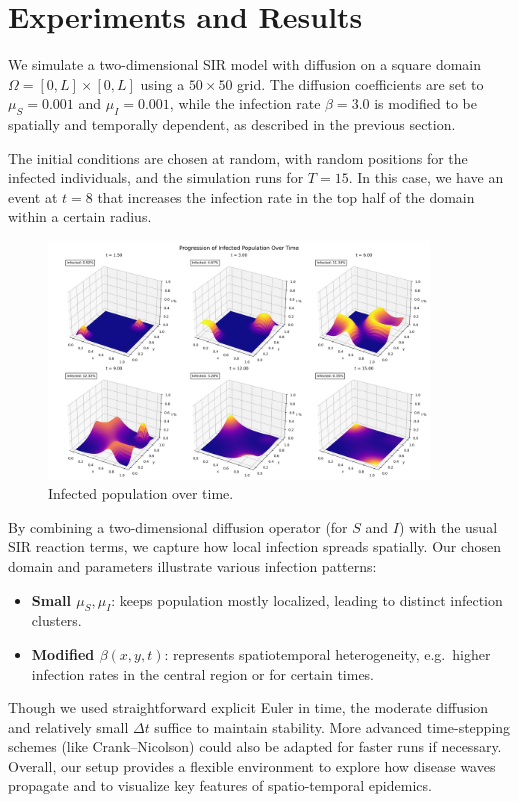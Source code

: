 \section{Experiments and Results}

We simulate a two-dimensional SIR model with diffusion on a square domain \(\Omega = [0,L]\times [0,L]\) using a \(50\times 50\) grid.
The diffusion coefficients are set to \(\mu_S = 0.001\) and \(\mu_I = 0.001\), while the infection rate \(\beta=3.0\) is modified to be spatially and temporally dependent, as described in the previous section.

The initial conditions are chosen at random, with random positions for the infected individuals, and the simulation runs for \(T=15\).
In this case, we have an event at \(t=8\) that increases the infection rate in the top half of the domain within a certain radius.

\begin{figure}[H]
  \centering
  \includegraphics[width=0.9\textwidth]{figures/infected_progression.png}
  \caption{Infected population over time.}
  \label{fig:infected_progression}
\end{figure}

By combining a two-dimensional diffusion operator (for $S$ and $I$) with the usual SIR reaction terms, we capture how local infection spreads spatially. Our chosen domain and parameters illustrate various infection patterns:
\begin{itemize}
  \item \textbf{Small \(\mu_S,\mu_I\)}: keeps population mostly localized, leading to distinct infection clusters.
  \item \textbf{Modified \(\beta(x,y,t)\)}: represents spatiotemporal heterogeneity, e.g.\ higher infection rates in the central region or for certain times.
\end{itemize}
Though we used straightforward explicit Euler in time, the moderate diffusion and relatively small \(\Delta t\) suffice to maintain stability. More advanced time-stepping schemes (like Crank--Nicolson) could also be adapted for faster runs if necessary. Overall, our setup provides a flexible environment to explore how disease waves propagate and to visualize key features of spatio-temporal epidemics.


